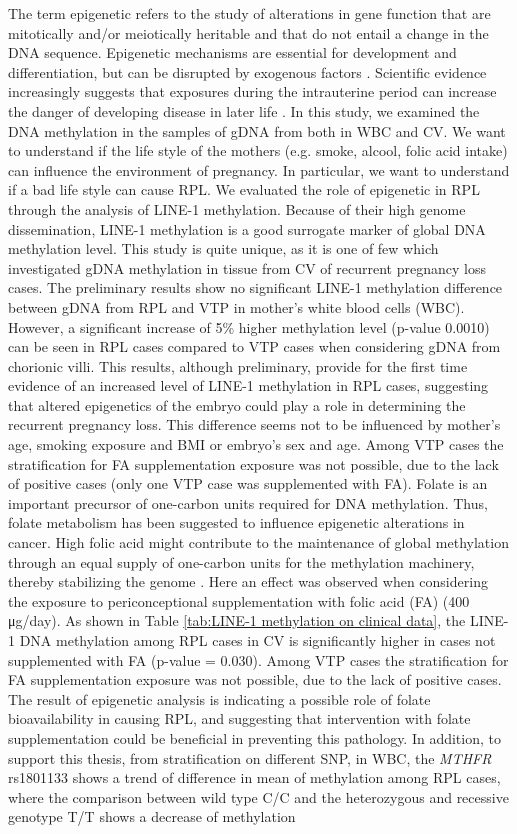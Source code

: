 \documentclass[journal,article,submit,moreauthors,pdftex]{Definitions/mdpi}
\begin{document}
\noindent The term epigenetic  refers  to  the  study  of  alterations in  gene  function  that  are mitotically and/or meiotically heritable and that do not entail a change in the DNA sequence. Epigenetic mechanisms are essential for development and differentiation, but can be disrupted by exogenous factors \cite{godderis2015global}. Scientific evidence increasingly suggests that exposures during the intrauterine period can increase the danger of developing disease in later life \cite{breton2009prenatal}. In this study, we examined the DNA methylation in the samples of gDNA from both in WBC and CV. We want to understand if the life style of the mothers (e.g. smoke, alcool, folic acid intake) can influence the environment of pregnancy. In particular, we want to understand if a bad life style can cause RPL. We evaluated the role of epigenetic in RPL through the analysis of LINE-1 methylation. Because of their high genome dissemination, LINE-1 methylation is a good surrogate marker of global DNA methylation level. This study is quite unique, as it is one of few which investigated gDNA methylation in tissue from CV of recurrent pregnancy loss cases. The preliminary results show no significant LINE-1 methylation difference between gDNA from RPL and VTP in mother’s white blood cells (WBC). However, a significant increase of 5\% higher methylation level (p-value 0.0010) can be seen in RPL cases compared to VTP cases when considering gDNA from chorionic villi. This results, although preliminary, provide for the first time evidence of an increased level of LINE-1 methylation in RPL cases, suggesting that altered epigenetics of the embryo could play a role in determining the recurrent pregnancy loss. This difference seems not to be influenced by mother's age, smoking exposure and BMI or embryo’s sex and age. Among VTP cases the stratification for FA supplementation exposure was not possible, due to the lack of positive cases (only one VTP case was supplemented with FA). Folate is an important precursor of one-carbon units required for DNA methylation. Thus, folate metabolism has been suggested to influence epigenetic alterations in cancer. High folic acid might contribute to the maintenance of global methylation through an equal supply of one-carbon units for the methylation machinery, thereby stabilizing the genome \cite{jin2009different}. Here an effect was observed when considering the exposure to periconceptional supplementation with folic acid (FA) (400 μg/day). As shown in Table \ref{tab:LINE-1 methylation on clinical data}, the LINE-1 DNA methylation among RPL cases in CV is significantly higher in cases not supplemented with FA (p-value = 0.030). Among VTP cases the stratification for FA supplementation exposure was not possible, due to the lack of positive cases. The result of epigenetic analysis is indicating a possible role of folate bioavailability in causing RPL, and suggesting that intervention with folate supplementation could be beneficial in preventing this pathology. In addition, to support this thesis, from stratification on different SNP, in WBC, the \textit{MTHFR} rs1801133 shows a trend of difference in mean of methylation among RPL cases, where the comparison between wild type C/C and the heterozygous and recessive genotype T/T shows a decrease of methylation 
\end{document}
